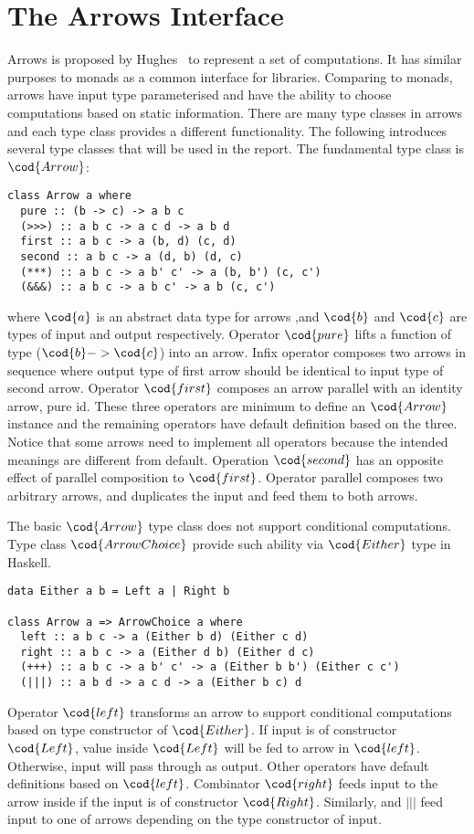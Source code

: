 
\section{The Arrows Interface}
Arrows is proposed by Hughes~\cite{Hughes:SCP00} to represent a set of computations. 
It has similar purposes to monads as a common interface for libraries.
Comparing to monads, arrows have input type parameterised and have the ability to 
choose computations based on static information. There
are many type classes in arrows and each type class provides a different functionality.
The following introduces several type classes that will be used in the report.
The fundamental type class is $\cod{Arrow}$:
\begin{verbatim}
class Arrow a where
  pure :: (b -> c) -> a b c
  (>>>) :: a b c -> a c d -> a b d
  first :: a b c -> a (b, d) (c, d)
  second :: a b c -> a (d, b) (d, c)
  (***) :: a b c -> a b' c' -> a (b, b') (c, c')
  (&&&) :: a b c -> a b c' -> a b (c, c')
\end{verbatim}
where $\cod{a}$ is an abstract data type for arrows ,and $\cod{b}$ and $\cod{c}$ are types
of input and output respectively. Operator $\cod{pure}$ lifts a function of type 
($\cod{b}->\cod{c}$) into an arrow. Infix operator \arrowop{>} composes two arrows in
sequence where output type of first arrow should be identical to input type of second arrow.
Operator $\cod{first}$ composes an arrow parallel with an identity arrow, pure id. These three
operators are minimum to define an $\cod{Arrow}$ instance and the remaining operators have 
default definition based on the three. Notice that some arrows need to implement all operators
because the intended meanings are different from default. Operation $\cod{second}$
has an opposite effect of parallel composition to $\cod{first}$. Operator \arrowop{*} parallel
composes two arbitrary arrows, and \arrowop{\&} duplicates the input and feed them to both arrows.

The basic $\cod{Arrow}$ type class does not support conditional computations. Type class
$\cod{ArrowChoice}$ provide such ability via $\cod{Either}$ type in Haskell.
\begin{verbatim}
data Either a b = Left a | Right b

class Arrow a => ArrowChoice a where
  left :: a b c -> a (Either b d) (Either c d)
  right :: a b c -> a (Either d b) (Either d c)
  (+++) :: a b c -> a b' c' -> a (Either b b') (Either c c')
  (|||) :: a b d -> a c d -> a (Either b c) d
\end{verbatim}
Operator $\cod{left}$ transforms an arrow to support conditional computations based on 
type constructor of $\cod{Either}$. If input is of constructor $\cod{Left}$, value inside 
$\cod{Left}$ will be fed to arrow in $\cod{left}$. Otherwise, input will pass through as 
output. Other operators have default definitions based on $\cod{left}$. 
Combinator $\cod{right}$ feeds input to the arrow inside if the input is
of constructor $\cod{Right}$. Similarly, \arrowop{+} and $|||$ feed input to one of
arrows depending on the type constructor of input.


